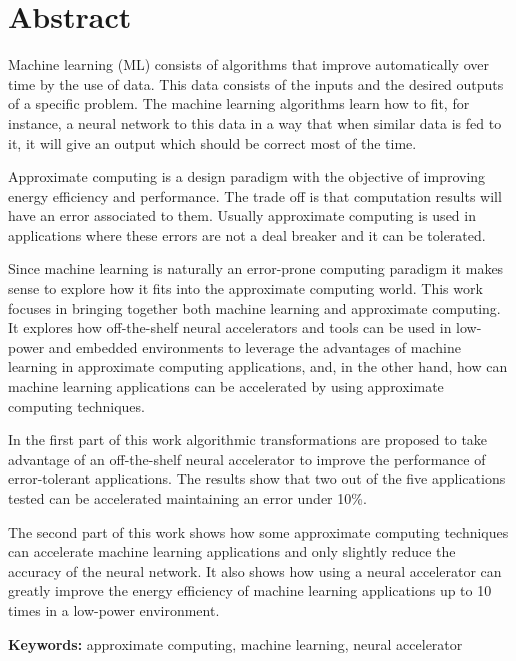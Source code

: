 \chapter*{Abstract}
\thispagestyle{empty}

Machine learning (ML) consists of algorithms that improve automatically over time by the use of data. This data consists of the inputs and the desired outputs of a specific problem. The machine learning algorithms learn how to fit, for instance, a neural network to this data in a way that when similar data is fed to it, it will give an output which should be correct most of the time.

Approximate computing is a design paradigm with the objective of improving energy efficiency and performance. The trade off is that computation results will have an error associated to them. Usually approximate computing is used in applications where these errors are not a deal breaker and it can be tolerated.

Since machine learning is naturally an error-prone computing paradigm it makes sense to explore how it fits into the approximate computing world. This work focuses in bringing together both machine learning and approximate computing. It explores how off-the-shelf neural accelerators and tools can be used in low-power and embedded environments to leverage the advantages of machine learning in approximate computing applications, and, in the other hand, how can machine learning applications can be accelerated by using approximate computing techniques.

In the first part of this work algorithmic transformations are proposed to take advantage of an off-the-shelf neural accelerator to improve the performance of error-tolerant applications. The results show that two out of the five applications tested can be accelerated maintaining an error under 10\%.

The second part of this work shows how some approximate computing techniques can accelerate machine learning applications and only slightly reduce the accuracy of the neural network. It also shows how using a neural accelerator can greatly improve the energy efficiency of machine learning applications up to 10 times in a low-power environment.

\bigskip


\textbf{Keywords:} approximate computing, machine learning, neural accelerator

\cleardoublepage

